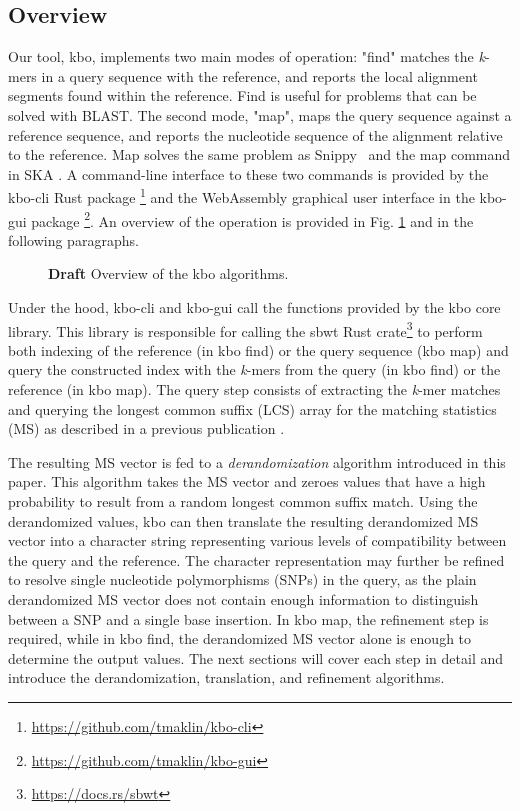 \documentclass[unnumsec,webpdf,contemporary,large]{oup-authoring-template}%
\theoremstyle{thmstyleone}%
\theoremstyle{thmstyletwo}%
\theoremstyle{thmstylethree}%
\begin{document}
\subsection{Overview}

Our tool, {\sf kbo}, implements two main modes of operation: "find" matches the \emph{k}-mers in a query sequence with the reference, and reports the local alignment segments found within the reference. Find is useful for problems that can be solved with BLAST. The second mode, "map", maps the query sequence against a reference sequence, and reports the nucleotide sequence of the alignment relative to the reference. Map solves the same problem as Snippy~\cite{seemann2015snippy} and the map command in SKA \cite{derelle2024seamless}. A command-line interface to these two commands is provided by the kbo-cli Rust package \footnote{\url{https://github.com/tmaklin/kbo-cli}} and the WebAssembly graphical user interface in the kbo-gui package \footnote{\url{https://github.com/tmaklin/kbo-gui}}. An overview of the operation is provided in Fig. \ref{fig1} and in the following paragraphs.
\begin{figure}[!t]%
\centering
{}
\caption{\textbf{Draft} Overview of the {\sf kbo} algorithms.}\label{fig1}
\end{figure}

Under the hood, kbo-cli and kbo-gui call the functions provided by the kbo core library. This library is responsible for calling the sbwt Rust crate\footnote{\url{https://docs.rs/sbwt}} to perform both indexing of the reference (in kbo find) or the query sequence (kbo map) and query the constructed index with the \emph{k}-mers from the query (in kbo find) or the reference (in kbo map). The query step consists of extracting the \emph{k}-mer matches and querying the longest common suffix (LCS) array for the matching statistics (MS) as described in a previous publication \cite{alanko2024finimizers}.

The resulting MS vector is fed to a \emph{derandomization} algorithm introduced in this paper. This algorithm takes the MS vector and zeroes values that have a high probability to result from a random longest common suffix match. Using the derandomized values, {\sf kbo} can then translate the resulting derandomized MS vector into a character string representing various levels of compatibility between the query and the reference. The character representation may further be refined to resolve single nucleotide polymorphisms (SNPs) in the query, as the plain derandomized MS vector does not contain enough information to distinguish between a SNP and a single base insertion. In kbo map, the refinement step is required, while in kbo find, the derandomized MS vector alone is enough to determine the output values. The next sections will cover each step in detail and introduce the derandomization, translation, and refinement algorithms.
\end{document}
